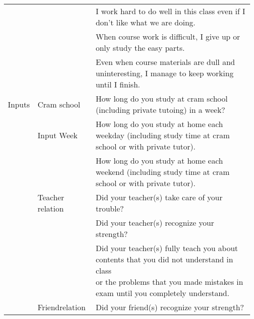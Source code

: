 \begin{tabular}{lll}
 &  & I work hard to do well in this class even if I don't like what we are doing.\\
 &  & When course work is difficult, I give up or only study the easy parts.\\
 &  & Even when course materials are dull and uninteresting, I manage to keep working until I finish.\\
Inputs & Cram school & How long do you study at cram school (including private tutoing) in a week?\\
 & Input Week & How long do you study at home each weekday (including study time at cram school or with private tutor). \\
 &  & How long do you study at home each weekend (including study time at cram school or with private tutor).\\
 & Teacher relation & Did your teacher(s) take care of your trouble?\\
 &  & Did your teacher(s) recognize your strength?\\
 &  & \shortstack[l]{Did your teacher(s) fully teach you about contents that you did not understand in class \\    or the problems that you made mistakes in exam until you completely understand.} \\
 & Friendrelation & Did your friend(s) recognize your strength?\\
 \hline \hline
\end{tabular}
